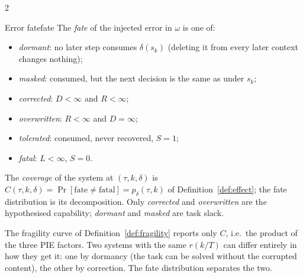 \begin{multicols}{2}
\begin{definition}{Error fate}{fate}
The \emph{fate} of the injected error in $\omega$ is one of:
\begin{itemize}[leftmargin=1.1em]
\item \emph{dormant}: no later step consumes $\delta(s_k)$ (deleting it from every later context changes nothing);
\item \emph{masked}: consumed, but the next decision is the same as under $s_k$;
\item \emph{corrected}: $D<\infty$ and $R<\infty$;
\item \emph{overwritten}: $R<\infty$ and $D=\infty$;
\item \emph{tolerated}: consumed, never recovered, $S{=}1$;
\item \emph{fatal}: $L<\infty$, $S{=}0$.
\end{itemize}
The \emph{coverage} of the system at $(\tau,k,\delta)$ is $C(\tau,k,\delta)=\Pr[\text{fate}\neq\text{fatal}]=p_\delta(\tau,k)$ of Definition~\ref{def:effect}; the fate distribution is its decomposition. Only \emph{corrected} and \emph{overwritten} are the hypothesised capability; \emph{dormant} and \emph{masked} are task slack.
\end{definition}

The fragility curve of Definition~\ref{def:fragility} reports only $C$, i.e.\ the product of the three PIE factors. Two systems with the same $r(k/T)$ can differ entirely in how they get it: one by dormancy (the task can be solved without the corrupted content), the other by correction. The fate distribution separates the two.


\end{multicols}
